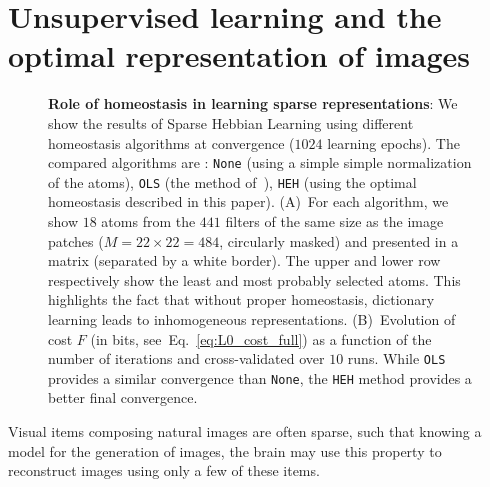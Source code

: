 \documentclass[letterpaper,final,conference,10pt]{IEEEtran}
\newcommand{\citep}[1]{\cite{#1}}
\newcommand{\seeFig}[1]{Figure~\ref{fig:#1}}%
\newcommand{\seeEq}[1]{Eq.~\ref{eq:#1}}%
\begin{document}
\section{Unsupervised learning and the optimal representation of images}%
% 
\begin{figure}[!ht]%
\caption{
{\bf Role of homeostasis in learning sparse representations}:
We show the results of Sparse Hebbian Learning using different homeostasis algorithms at convergence ($1024$ learning epochs). The compared algorithms are : \texttt{None} (using a simple simple normalization of the atoms), \texttt{OLS} (the method of~\citep{Olshausen97}), \texttt{HEH} (using the optimal homeostasis described in this paper). {\sf (A)}~For each algorithm, we show $18$ atoms from the $441$ filters of the same size as the image patches ($M= 22 \times 22=484$, circularly masked) and presented in a matrix (separated by a white border). The upper and lower row respectively show the least and most probably selected atoms. This highlights the fact that without proper homeostasis, dictionary learning leads to inhomogeneous representations. {\sf (B)}~Evolution of cost  $F$ (in bits, see~\seeEq{L0_cost_full}) as a function of the number of iterations and cross-validated over $10$ runs. While \texttt{OLS} provides a similar convergence than  \texttt{None}, the \texttt{HEH}  method provides a better final convergence.%
\label{fig:map}}%
\end{figure}%
Visual items composing natural images are often sparse, such that knowing a model for the generation of images, the brain may use this property to reconstruct images using only a few of these items.
\end{document}
